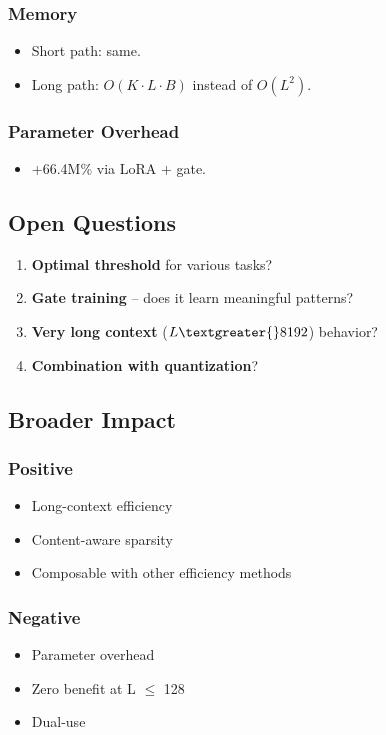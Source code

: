 \subsubsection{Memory}
\begin{itemize}
\item Short path: same.
\item Long path: $O(K \cdot L \cdot B)$ instead of $O(L^2)$.

\end{itemize}
\subsubsection{Parameter Overhead}
\begin{itemize}
\item +66.4M\% via LoRA + gate.

\end{itemize}
\subsection{Open Questions}

\begin{enumerate}
\item \textbf{Optimal threshold} for various tasks?
\item \textbf{Gate training} -- does it learn meaningful patterns?
\item \textbf{Very long context} ($L \textgreater{} 8192$) behavior?
\item \textbf{Combination with quantization}?

\end{enumerate}
\subsection{Broader Impact}

\subsubsection{Positive}
\begin{itemize}
\item Long-context efficiency
\item Content-aware sparsity
\item Composable with other efficiency methods

\end{itemize}
\subsubsection{Negative}
\begin{itemize}
\item Parameter overhead
\item Zero benefit at L $\le$ 128
\item Dual-use

\end{itemize}
